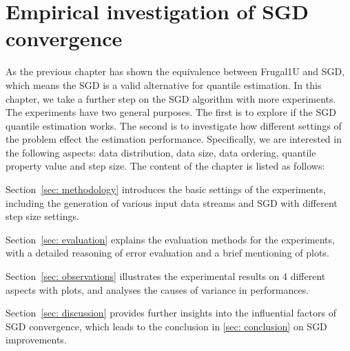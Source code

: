 
% 
\graphicspath{{Figures/Experiment_results/SGD/}{./}} 
\captionsetup[figure]{font=scriptsize,labelfont=bf}


\chapter{Empirical investigation of SGD convergence}
\label{ch: sgd_exp}

As the previous chapter has shown the equivalence between Frugal1U and SGD, which means the SGD is a valid alternative for quantile estimation.
In this chapter, we take a further step on the SGD algorithm with more experiments.
The experiments have two general purposes. The first is to explore if the SGD quantile estimation works.
The second is to investigate how different settings of the problem effect the estimation performance. Specifically, we are interested in the following aspects: data distribution, data size, data ordering, quantile property value and step size. The content of the chapter is listed as follows:

Section~\ref{sec: methodology} introduces the basic settings of the experiments, including the generation of various input data streams and SGD with different step size settings.

Section~\ref{sec: evaluation} explains the evaluation methods for the experiments, with a detailed reasoning of error evaluation and a brief mentioning of plots.

Section~\ref{sec: observations} illustrates the experimental results on 4 different aspects with plots, and analyses the causes of variance in performances.

Section~\ref{sec: discussion} provides further insights into the influential factors of SGD convergence, which leads to the conclusion in \ref{sec: conclusion} on SGD improvements.


